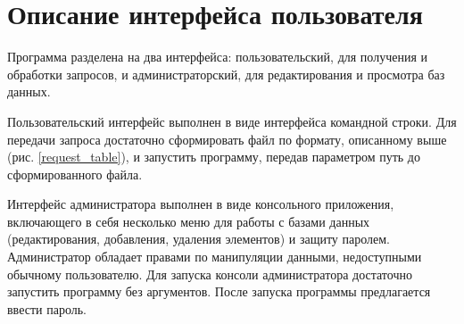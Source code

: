 \section{Описание интерфейса пользователя}

Программа разделена на два интерфейса: 
пользовательский, для получения и обработки запросов, 
и администраторский, для редактирования и просмотра баз данных.

Пользовательский интерфейс выполнен в виде интерфейса командной строки. 
Для передачи запроса достаточно сформировать файл по формату, 
описанному выше 
(рис. \ref{request_table}), 
и запустить программу, 
передав параметром путь до сформированного файла.

Интерфейс администратора выполнен в виде консольного приложения, 
включающего в себя несколько меню для работы с 
базами данных 
(редактирования, добавления, удаления элементов) 
и защиту паролем. 
Администратор обладает правами по манипуляции данными, 
недоступными обычному пользователю. 
Для запуска консоли администратора достаточно 
запустить программу без аргументов. 
После запуска программы предлагается ввести пароль.